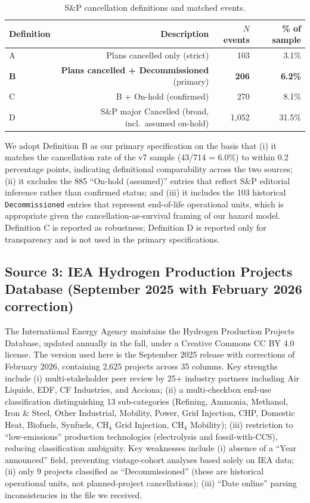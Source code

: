 \documentclass[11pt,a4paper]{article}
\begin{document}
\begin{table}[ht]
\centering
\caption{S\&P cancellation definitions and matched events.}
\label{tab:ch8-cancel-defs}
\begin{tabular}{lrrr}
\toprule
Definition & Description & $N$ events & \% of sample \\
\midrule
A & Plans cancelled only (strict) & 103 & 3.1\% \\
\textbf{B} & \textbf{Plans cancelled + Decommissioned} (primary) & \textbf{206} & \textbf{6.2\%} \\
C & B + On-hold (confirmed) & 270 & 8.1\% \\
D & S\&P major Cancelled (broad, incl.\ assumed on-hold) & 1{,}052 & 31.5\% \\
\bottomrule
\end{tabular}
\end{table}

We adopt Definition B as our primary specification on the basis that (i) it matches the cancellation rate of the v7 sample (43/714 = 6.0\%) to within 0.2 percentage points, indicating definitional comparability across the two sources; (ii) it excludes the 885 ``On-hold (assumed)'' entries that reflect S\&P editorial inference rather than confirmed status; and (iii) it includes the 103 historical \texttt{Decommissioned} entries that represent end-of-life operational units, which is appropriate given the cancellation-as-survival framing of our hazard model. Definition C is reported as robustness; Definition D is reported only for transparency and is not used in the primary specifications.

\subsection{Source 3: IEA Hydrogen Production Projects Database (September 2025 with February 2026 correction)}

The International Energy Agency maintains the Hydrogen Production Projects Database, updated annually in the fall, under a Creative Commons CC BY 4.0 license. The version used here is the September 2025 release with corrections of February 2026, containing 2{,}625 projects across 35 columns. Key strengths include (i) multi-stakeholder peer review by 25+ industry partners including Air Liquide, EDF, CF Industries, and Acciona; (ii) a multi-checkbox end-use classification distinguishing 13 sub-categories (Refining, Ammonia, Methanol, Iron \& Steel, Other Industrial, Mobility, Power, Grid Injection, CHP, Domestic Heat, Biofuels, Synfuels, CH$_4$ Grid Injection, CH$_4$ Mobility); (iii) restriction to ``low-emissions'' production technologies (electrolysis and fossil-with-CCS), reducing classification ambiguity. Key weaknesses include (i) absence of a ``Year announced'' field, preventing vintage-cohort analyses based solely on IEA data; (ii) only 9 projects classified as ``Decommissioned'' (these are historical operational units, not planned-project cancellations); (iii) ``Date online'' parsing inconsistencies in the file we received.
\end{document}
